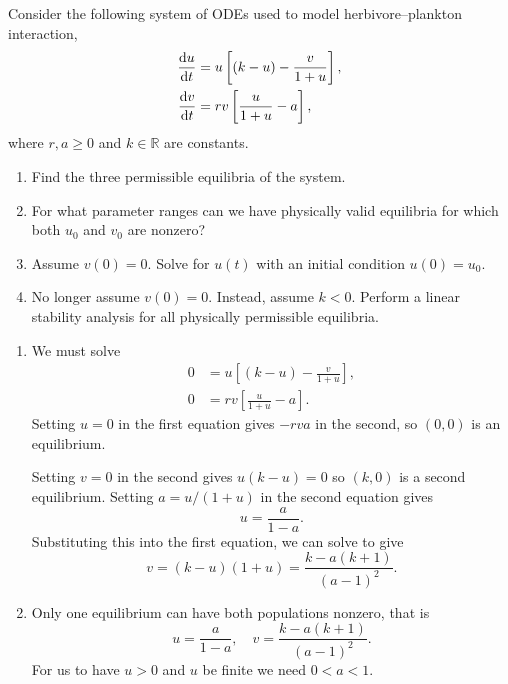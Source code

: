 \documentclass[a4paper, 12pt]{article}
\begin{document}
\begin{enumerate}[label={\bf \arabic{*}.\;}, ref={\arabic{*}},itemsep=3ex, left=0ex]
    {
      Consider the following system of ODEs used to model herbivore--plankton interaction,
      \begin{subequations}
        \begin{align}
          \fd{u}{t} &= u\left[(k-u) - \frac{v}{1+u}\right],\\
          \fd{v}{t} &= r v\left[\frac{u}{1+u}-a\right],
        \end{align}
      \end{subequations}
      where $r,a\geq 0$ and $k \in \mathbb{R}$ are constants.
      \begin{enumerate}[label=(\alph*)]
        \item Find the three permissible equilibria of the system.
        \item For what parameter ranges can we have physically valid equilibria for which both $u_0$ and $v_0$ are nonzero?
        \item Assume $v(0)=0$. Solve for $u(t)$ with an initial condition $u(0)=u_0$.
        \item No longer assume $v(0)=0$. Instead, assume $k<0$. Perform a linear stability analysis for all physically permissible equilibria.
      \end{enumerate}
    }
    {
      \begin{enumerate}[label=(\alph*)]
        \item{
            We must solve
            \begin{subequations}
              \begin{align}
                0&= u\left[(k-u) - \frac{v}{1+u}\right],\\
                0 &= r v\left[\frac{u}{1+u}-a\right].
              \end{align}
            \end{subequations}
            Setting $u=0$ in the first equation gives $-rva$ in the second, so $(0,0)$ is an equilibrium.

            Setting $v=0$ in the second gives $u(k-u)=0$ so $(k,0)$ is a second equilibrium.
            Setting $a= u/(1+u)$ in the second equation gives
            \begin{equation}
              u = \frac{a}{1-a}.
            \end{equation}
            Substituting this into the first equation, we can solve to give
            \begin{equation}
              v = (k-u)(1+u) = \frac{k-a (k+1)}{(a-1)^2}.
            \end{equation}
          }
        \item{
            Only one equilibrium can have both populations nonzero, that is
            \begin{equation}
              u = \frac{a}{1-a},\quad   v = \frac{k-a (k+1)}{(a-1)^2}.
            \end{equation}
            For us to have $u>0$ and $u$ be finite we need $0 < a<1$.

}
\end{enumerate}}
\end{enumerate}
\end{document}
